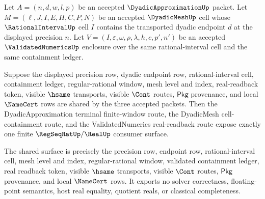 \begin{theorem}
\label{thm:dyadicapproximation-mesh-validated-real-boundary}
Let $A=(n,d,w,l,p)$ be an accepted $\DyadicApproximationUp$ packet. Let
$M=(\ell,J,I,E,H,C,P,N)$ be an accepted $\DyadicMeshUp$ cell whose
$\RationalIntervalUp$ cell $I$ contains the transported dyadic endpoint $d$ at
the displayed precision $n$. Let
$V=(I,\varepsilon,\omega,\rho,\lambda,h,c,p',n')$ be an accepted
$\ValidatedNumericsUp$ enclosure over the same rational-interval cell and the
same containment ledger.

Suppose the displayed precision row, dyadic endpoint row,
rational-interval cell, containment ledger, regular-rational window, mesh level
and index, real-readback token, visible $\hsame$ transports, visible $\Cont$
routes, $\mathsf{Pkg}$ provenance, and local $\NameCert$ rows are shared by the
three accepted packets. Then the DyadicApproximation terminal finite-window
route, the DyadicMesh cell-containment route, and the ValidatedNumerics
real-readback route expose exactly one finite $\RegSeqRatUp/\RealUp$ consumer
surface.

The shared surface is precisely the precision row, endpoint row,
rational-interval cell, mesh level and index, regular-rational window,
validated containment ledger, real readback token, visible $\hsame$ transports,
visible $\Cont$ routes, $\mathsf{Pkg}$ provenance, and local $\NameCert$ rows.
It exports no solver correctness, floating-point semantics, host real equality,
quotient reals, or classical completeness.
\end{theorem}
